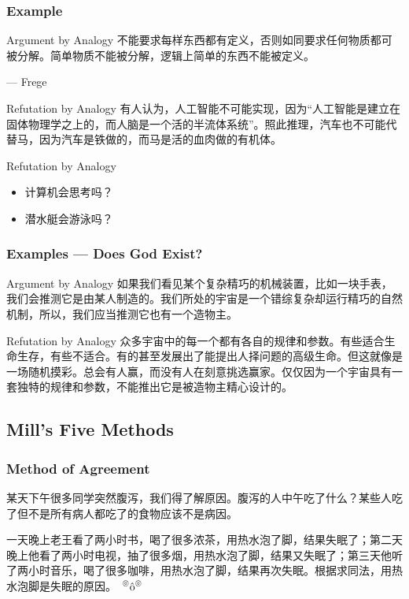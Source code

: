 \documentclass[UTF8,11pt,colorlinks,compress,openany]{beamer}%
\begin{document}
\begin{frame}\frametitle{Example}
	\begin{block}{Argument by Analogy}
		不能要求每样东西都有定义，否则如同要求任何物质都可被分解。简单物质不能被分解，逻辑上简单的东西不能被定义。\par \hfill --- Frege
	\end{block}
	\begin{block}{Refutation by Analogy}
		有人认为，人工智能不可能实现，因为“人工智能是建立在固体物理学之上的，而人脑是一个活的半流体系统”。照此推理，汽车也不可能代替马，因为汽车是铁做的，而马是活的血肉做的有机体。
	\end{block}
	\begin{block}{Refutation by Analogy}
		\begin{itemize}
			\item 计算机会思考吗？
			\item 潜水艇会游泳吗？
		\end{itemize}
	\end{block}
\end{frame}

\begin{frame}\frametitle{Examples --- Does God Exist?}
	\begin{block}{Argument by Analogy}
		如果我们看见某个复杂精巧的机械装置，比如一块手表，我们会推测它是由某人制造的。我们所处的宇宙是一个错综复杂却运行精巧的自然机制，所以，我们应当推测它也有一个造物主。
	\end{block}
	\begin{block}{Refutation by Analogy}
		众多宇宙中的每一个都有各自的规律和参数。有些适合生命生存，有些不适合。有的甚至发展出了能提出人择问题的高级生命。但这就像是一场随机摸彩。总会有人赢，而没有人在刻意挑选赢家。仅仅因为一个宇宙具有一套独特的规律和参数，不能推出它是被造物主精心设计的。
	\end{block}
\end{frame}

\subsection{Mill's Five Methods}

\begin{frame}\frametitle{Method of Agreement}
		\begin{prooftree}
			\noLine
			\alwaysSingleLine
		\end{prooftree}
		\begin{block}{}
			某天下午很多同学突然腹泻，我们得了解原因。腹泻的人中午吃了什么？某些人吃了但不是所有病人都吃了的食物应该不是病因。
		\end{block}
		\begin{block}{}
			一天晚上老王看了两小时书，喝了很多浓茶，用热水泡了脚，结果失眠了；第二天晚上他看了两小时电视，抽了很多烟，用热水泡了脚，结果又失眠了；第三天他听了两小时音乐，喝了很多咖啡，用热水泡了脚，结果再次失眠。根据求同法，用热水泡脚是失眠的原因。 \textcolor{red}{$\sideset{^\circledcirc}{^\circledcirc}{\operatorname{\hat{o}}}$}
	\end{block}
\end{frame}
\end{document}
